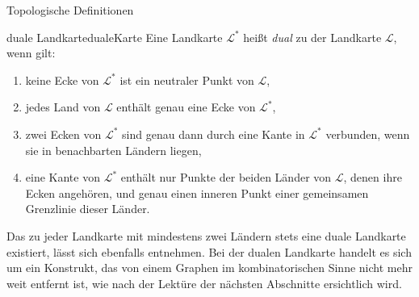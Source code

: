 \begin{section}{Topologische Definitionen}
 \begin{definitionl}{duale Landkarte}{dualeKarte}
  Eine Landkarte $\mathcal{L}^*$ heißt \textit{dual} zu der Landkarte $\mathcal{L}$, wenn gilt:
  \begin{enumerate}
   \item keine Ecke von $\mathcal{L}^*$ ist ein neutraler Punkt von $\mathcal{L}$,
   \item jedes Land von $\mathcal{L}$ enthält genau eine Ecke von $\mathcal{L}^*$,
   \item zwei Ecken von $\mathcal{L}^*$ sind genau dann durch eine Kante in $\mathcal{L}^*$ verbunden, wenn sie in benachbarten Ländern liegen,
   \item eine Kante von $\mathcal{L}^*$ enthält nur Punkte der beiden Länder von $\mathcal{L}$, denen ihre Ecken angehören, und genau einen inneren Punkt einer gemeinsamen Grenzlinie dieser Länder.
  \end{enumerate}
 \end{definitionl}
 
 Das zu jeder Landkarte mit mindestens zwei Ländern stets eine duale Landkarte existiert, lässt sich ebenfalls \cite{fritsch} entnehmen. Bei der dualen Landkarte handelt es sich um ein Konstrukt, das von einem Graphen im kombinatorischen Sinne nicht mehr weit entfernt ist, wie nach der Lektüre der nächsten Abschnitte ersichtlich wird.
\end{section}